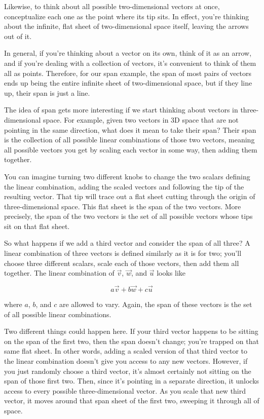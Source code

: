 Likewise, to think about all possible two-dimensional vectors at once,
conceptualize each one as the point where its tip sits. In effect, you're
thinking about the infinite, flat sheet of two-dimensional space itself, leaving
the arrows out of it.

In general, if you're thinking about a vector on its own, think of it as an
arrow, and if you're dealing with a collection of vectors, it's convenient to
think of them all as points. Therefore, for our span example, the span of most
pairs of vectors ends up being the entire infinite sheet of two-dimensional
space, but if they line up, their span is just a line.

The idea of span gets more interesting if we start thinking about vectors in
three-dimensional space. For example, given two vectors in 3D space that are not
pointing in the same direction, what does it mean to take their span? Their span
is the collection of all possible linear combinations of those two vectors,
meaning all possible vectors you get by scaling each vector in some way, then
adding them together.

You can imagine turning two different knobs to change the two scalars defining
the linear combination, adding the scaled vectors and following the tip of the
resulting vector. That tip will trace out a flat sheet cutting through the
origin of three-dimensional space. This flat sheet is the span of the two
vectors. More precisely, the span of the two vectors is the set of all possible
vectors whose tips sit on that flat sheet.

So what happens if we add a third vector and consider the span of all three? A
linear combination of three vectors is defined similarly as it is for two;
you'll choose three different scalars, scale each of those vectors, then add
them all together. The linear combination of $\vec{v}$, $\vec{w}$, and $\vec{u}$
looks like

\begin{equation*}
  a\vec{v} + b\vec{w} + c\vec{u}
\end{equation*}

where $a$, $b$, and $c$ are allowed to vary. Again, the span of these vectors is
the set of all possible linear combinations.

Two different things could happen here. If your third vector happens to be
sitting on the span of the first two, then the span doesn't change; you're
trapped on that same flat sheet. In other words, adding a scaled version of that
third vector to the linear combination doesn't give you access to any new
vectors. However, if you just randomly choose a third vector, it's almost
certainly not sitting on the span of those first two. Then, since it's pointing
in a separate direction, it unlocks access to every possible three-dimensional
vector. As you scale that new third vector, it moves around that span sheet of
the first two, sweeping it through all of space.

